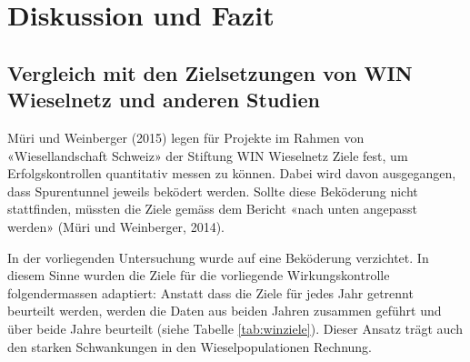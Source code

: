 \documentclass[
  oneside]{scrbook}
\begin{document}
\hypertarget{diskussion-und-fazit}{%
\chapter{Diskussion und Fazit}\label{diskussion-und-fazit}}

\hypertarget{vergleich-mit-den-zielsetzungen-von-win-wieselnetz-und-anderen-studien}{%
\section{Vergleich mit den Zielsetzungen von WIN Wieselnetz und anderen Studien}\label{vergleich-mit-den-zielsetzungen-von-win-wieselnetz-und-anderen-studien}}

Müri und Weinberger (2015) legen für Projekte im Rahmen von «Wiesellandschaft Schweiz» der Stiftung WIN Wieselnetz Ziele fest, um Erfolgskontrollen quantitativ messen zu können. Dabei wird davon ausgegangen, dass Spurentunnel jeweils beködert werden. Sollte diese Beköderung nicht stattfinden, müssten die Ziele gemäss dem Bericht «nach unten angepasst werden» (Müri und Weinberger, 2014).

In der vorliegenden Untersuchung wurde auf eine Beköderung verzichtet. In diesem Sinne wurden die Ziele für die vorliegende Wirkungskontrolle folgendermassen adaptiert: Anstatt dass die Ziele für jedes Jahr getrennt beurteilt werden, werden die Daten aus beiden Jahren zusammen geführt und über beide Jahre beurteilt (siehe Tabelle \ref{tab:winziele}). Dieser Ansatz trägt auch den starken Schwankungen in den Wieselpopulationen Rechnung.
\end{document}
